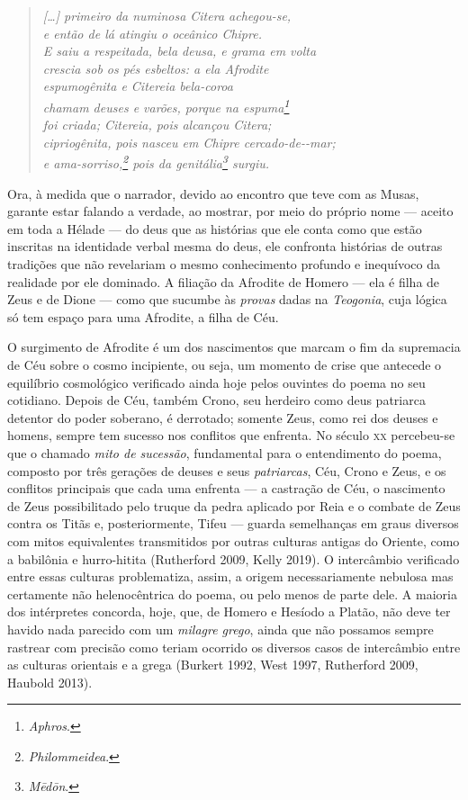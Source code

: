 \begin{verse}
\textit{
{[}\ldots{}{]} primeiro da numinosa Citera achegou-se,\\
e então de lá atingiu o oceânico Chipre.\\
E saiu a respeitada, bela deusa, e grama em volta\\
crescia sob os pés esbeltos: a ela Afrodite\\ %
espumogênita e Citereia bela-coroa\\
chamam deuses e varões, porque na espuma\footnote{\textit{Aphros}.}\\
foi criada; Citereia, pois alcançou Citera;\\
cipriogênita, pois nasceu em Chipre cercado-de-\qb{}-mar;\\
e ama-sorriso,\footnote{\textit{Philommeidea}.} pois da genitália\footnote{\textit{Mēdōn}.} surgiu.
}
\end{verse}

Ora, à medida que o narrador, devido ao encontro que teve com as Musas,
garante estar falando a verdade, ao mostrar, por meio do próprio nome ---
aceito em toda a Hélade --- do deus que as histórias que ele conta como
que estão inscritas na identidade verbal mesma do deus, ele confronta
histórias de outras tradições que não revelariam o mesmo
conhecimento profundo e inequívoco da realidade por ele dominado. A
filiação da Afrodite de Homero --- ela é filha de Zeus e de Dione --- como
que sucumbe às \textit{provas} dadas na \textit{Teogonia}, cuja lógica só tem
espaço para uma Afrodite, a filha de Céu.

O surgimento de Afrodite é um dos nascimentos que marcam o fim da
supremacia de Céu sobre o cosmo incipiente, ou seja, um momento de crise
que antecede o equilíbrio cosmológico verificado ainda hoje pelos
ouvintes do poema no seu cotidiano. Depois de Céu, também Crono, seu
herdeiro como deus patriarca detentor do poder soberano, é derrotado;
somente Zeus, como rei dos deuses e homens, sempre tem sucesso nos
conflitos que enfrenta. No século \textsc{xx} percebeu-se que o chamado \textit{mito de
sucessão}, fundamental para o entendimento do poema, composto por três
gerações de deuses e seus \textit{patriarcas}, Céu, Crono e Zeus, e os
conflitos principais que cada uma enfrenta --- a castração de Céu, o
nascimento de Zeus possibilitado pelo truque da pedra aplicado por Reia
e o combate de Zeus contra os Titãs e, posteriormente, Tifeu --- guarda
semelhanças em graus diversos com mitos equivalentes transmitidos por
outras culturas antigas do Oriente, como a babilônia e hurro-hitita
(Rutherford 2009, Kelly 2019). O intercâmbio verificado entre essas
culturas problematiza, assim, a origem necessariamente nebulosa mas
certamente não helenocêntrica do poema, ou pelo menos de parte dele. A
maioria dos intérpretes concorda, hoje, que, de Homero e Hesíodo a
Platão, não deve ter havido nada parecido com um \textit{milagre grego},
ainda que não possamos sempre rastrear com precisão como teriam ocorrido
os diversos casos de intercâmbio entre as culturas orientais e a grega
(Burkert 1992, West 1997, Rutherford 2009, Haubold 2013).

